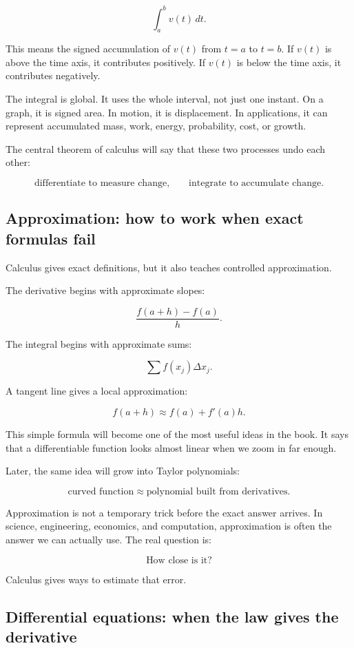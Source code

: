 \[
\int_a^b v(t)\,dt.
\]

This means the signed accumulation of \(v(t)\) from \(t=a\) to \(t=b\). If \(v(t)\) is above the time axis, it contributes positively. If \(v(t)\) is below the time axis, it contributes negatively.

The integral is global. It uses the whole interval, not just one instant. On a graph, it is signed area. In motion, it is displacement. In applications, it can represent accumulated mass, work, energy, probability, cost, or growth.

The central theorem of calculus will say that these two processes undo each other:

\[
\boxed{
\text{differentiate to measure change,}
\qquad
\text{integrate to accumulate change.}
}
\]

\subsection{Approximation: how to work when exact formulas fail}

Calculus gives exact definitions, but it also teaches controlled approximation.

The derivative begins with approximate slopes:

\[
\frac{f(a+h)-f(a)}{h}.
\]

The integral begins with approximate sums:

\[
\sum f(x_j)\Delta x_j.
\]

A tangent line gives a local approximation:

\[
f(a+h)\approx f(a)+f'(a)h.
\]

This simple formula will become one of the most useful ideas in the book. It says that a differentiable function looks almost linear when we zoom in far enough.

Later, the same idea will grow into Taylor polynomials:

\[
\text{curved function}
\approx
\text{polynomial built from derivatives}.
\]

Approximation is not a temporary trick before the exact answer arrives. In science, engineering, economics, and computation, approximation is often the answer we can actually use. The real question is:

\[
\text{How close is it?}
\]

Calculus gives ways to estimate that error.

\subsection{Differential equations: when the law gives the derivative}

